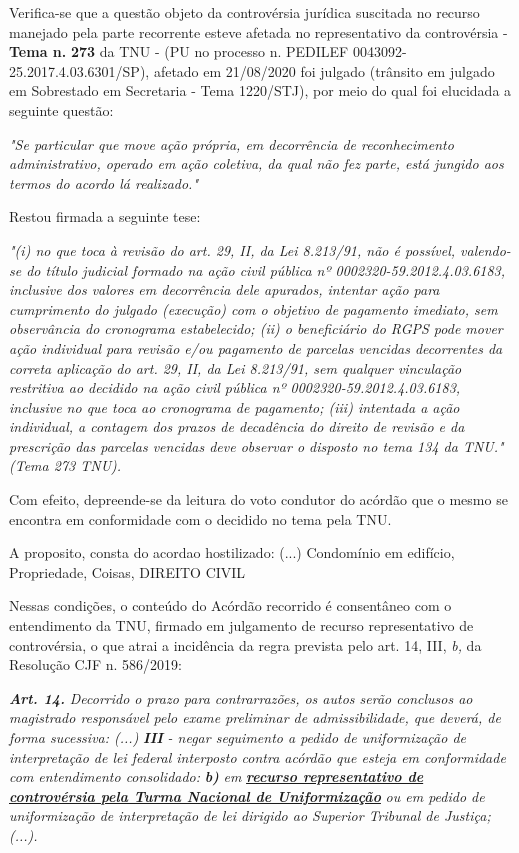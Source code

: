 \documentclass[12pt]{article}
\begin{document}
\justifying
\noindent Verifica-se que a questão objeto da controvérsia jurídica suscitada no recurso manejado pela parte recorrente esteve afetada no representativo da controvérsia - \textbf{Tema n. }\textbf{273} da TNU - (PU no processo n. PEDILEF 0043092-25.2017.4.03.6301/SP),  afetado em 21/08/2020 foi julgado (trânsito em julgado em Sobrestado em Secretaria - Tema 1220/STJ), por meio do qual foi elucidada a seguinte questão:

\noindent \textit{"Se particular que move ação própria, em decorrência de reconhecimento administrativo, operado em ação coletiva, da qual não fez parte, está jungido aos termos do acordo lá realizado."}

\noindent Restou firmada a seguinte tese:

\noindent \textit{"(i) no que toca à revisão do art. 29, II, da Lei 8.213/91, não é possível, valendo-se do título judicial formado na ação civil pública nº 0002320-59.2012.4.03.6183, inclusive dos valores em decorrência dele apurados, intentar ação para cumprimento do julgado (execução) com o objetivo de pagamento imediato, sem observância do cronograma estabelecido; (ii) o beneficiário do RGPS pode mover ação individual para revisão e/ou pagamento de parcelas vencidas decorrentes da correta aplicação do art. 29, II, da Lei 8.213/91, sem qualquer vinculação restritiva ao decidido na ação civil pública nº 0002320-59.2012.4.03.6183, inclusive no que toca ao cronograma de pagamento; (iii) intentada a ação individual, a contagem dos prazos de decadência do direito de revisão e da prescrição das parcelas vencidas deve observar o disposto no tema 134 da TNU." (Tema 273 TNU).}

\noindent Com efeito, depreende-se da leitura do voto condutor do acórdão que o mesmo se encontra em conformidade com o decidido no  tema pela TNU.

\noindent A proposito, consta do acordao hostilizado: (...) Condomínio em edifício, Propriedade, Coisas, DIREITO CIVIL

\noindent Nessas condições, o conteúdo do Acórdão recorrido é consentâneo com o entendimento da TNU, firmado em julgamento de recurso representativo de controvérsia, o que atrai a incidência da regra prevista pelo art. 14, III, \textit{b,} da Resolução CJF n. 586/2019:

\noindent \textit{\textbf{Art. 14.}}\textit{ Decorrido o prazo para contrarrazões, os autos serão conclusos ao magistrado responsável pelo exame preliminar de admissibilidade, que deverá, de forma sucessiva: (...) }\textit{\textbf{III }}\textit{- negar seguimento a pedido de uniformização de interpretação de lei federal interposto contra acórdão que esteja em conformidade com entendimento consolidado: }\textit{\textbf{b)}}\textit{ em }\uline{\textit{\textbf{recurso representativo de controvérsia pela Turma Nacional de Uniformização}}}\textit{ ou em pedido de uniformização de interpretação de lei dirigido ao Superior Tribunal de Justiça;(...).}
\end{document}
